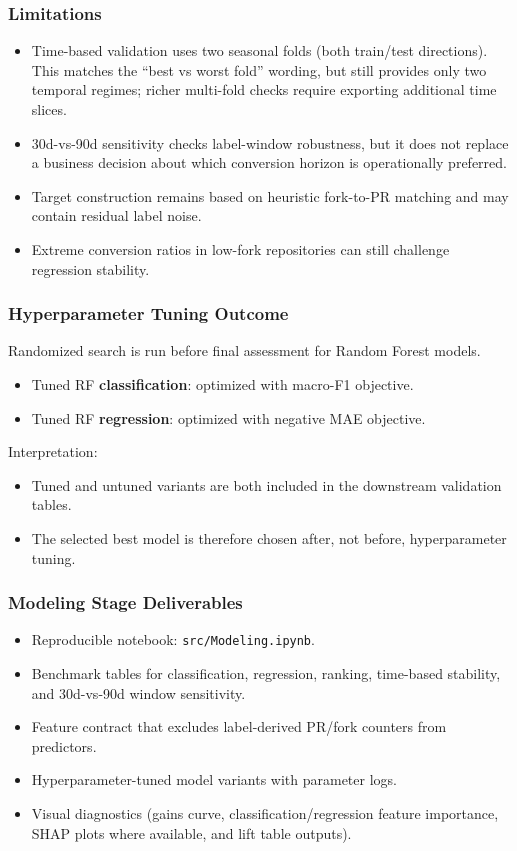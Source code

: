 \subsubsection{Limitations}

\begin{itemize}
    \item Time-based validation uses two seasonal folds (both train/test directions). This matches the ``best vs worst fold'' wording, but still provides only two temporal regimes; richer multi-fold checks require exporting additional time slices.
    \item 30d-vs-90d sensitivity checks label-window robustness, but it does not replace a business decision about which conversion horizon is operationally preferred.
    \item Target construction remains based on heuristic fork-to-PR matching and may contain residual label noise.
    \item Extreme conversion ratios in low-fork repositories can still challenge regression stability.
\end{itemize}

\subsubsection{Hyperparameter Tuning Outcome}

Randomized search is run before final assessment for Random Forest models.
\begin{itemize}
    \item Tuned RF \textbf{classification}: optimized with macro-F1 objective.
    \item Tuned RF \textbf{regression}: optimized with negative MAE objective.
\end{itemize}

Interpretation:
\begin{itemize}
    \item Tuned and untuned variants are both included in the downstream validation tables.
    \item The selected best model is therefore chosen after, not before, hyperparameter tuning.
\end{itemize}

\subsubsection{Modeling Stage Deliverables}

\begin{itemize}
    \item Reproducible notebook: \texttt{src/Modeling.ipynb}.
    \item Benchmark tables for classification, regression, ranking, time-based stability, and 30d-vs-90d window sensitivity.
    \item Feature contract that excludes label-derived PR/fork counters from predictors.
    \item Hyperparameter-tuned model variants with parameter logs.
    \item Visual diagnostics (gains curve, classification/regression feature importance, SHAP plots where available, and lift table outputs).
\end{itemize}
